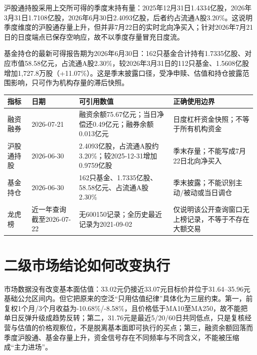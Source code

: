 沪股通持股采用上交所可得的季度末持有量：2025年12月31日1.4334亿股，2026年3月31日1.7108亿股，2026年6月30日2.4093亿股，后者约占流通A股3.20\%。这说明季度维度的沪股通存量上升，但并非7月22日的实时北向净买入；针对2026年7月21日的日度端点已保存空响应，故不以季度存量冒充日度流。

基金持仓的最新可得报告期为2026年6月30日：162只基金合计持有1.7335亿股、对应市值58.58亿元，占流通A股2.30\%，较2026年3月31日的112只基金、1.5608亿股增加1,727.8万股（+11.07\%）。这是季末披露口径，受净申赎、估值和持仓披露范围影响，只可作为机构存量的滞后快照。

\begin{exhibitbox}
\small
\begin{tabularx}{\exhibitboxwidth}{L{2.4cm}L{2.1cm}L{4.1cm}X}
\toprule
\textbf{指标} & \textbf{日期} & \textbf{可引用数值} & \textbf{正确使用边界} \\
\midrule
融资融券 & 2026-07-21 & 融资余额75.67亿元；当日净偿还0.49亿元；融券余额0.013亿元 & 日度杠杆资金快照；不等于所有机构资金 \\
沪股通持股 & 2026-06-30 & 2.4093亿股，占流通A股约3.20\%；较2025-12-31增加0.9759亿股 & 季末存量；不能写成7月22日北向净买入 \\
基金持仓 & 2026-06-30 & 162只基金、1.7335亿股、58.58亿元、占流通A股2.30\% & 季末披露；不能识别主动/被动或当日调仓 \\
龙虎榜 & 近一年查询截至2026-07-22 & 无600150记录；全历史最近记录为2021-09-02 & 仅说明该公开查询窗口无上榜记录，不等于不存在大额交易 \\
\bottomrule
\end{tabularx}
\end{exhibitbox}

\section{二级市场结论如何改变执行}

市场数据没有改变基本面估值：33.02元仍接近33.07元目标价并位于31.64--35.96元基础公允区间内。但它把原来的空泛“只用估值纪律”具体化为三层约束。第一，前复权1个月/3个月收益为-10.68\%/-8.58\%，且价格低于MA10至MA250，故不能把单日反弹升级成趋势反转；第二，31.76元是最近5/20/60日共同低点，只是复核经营与估值的价格观察位，不是脱离基本面即可执行的买点；第三，融资余额回落而季度沪股通、基金存量上升，资金信号存在不同频率与不同含义，不能被压缩成“主力进场”。

